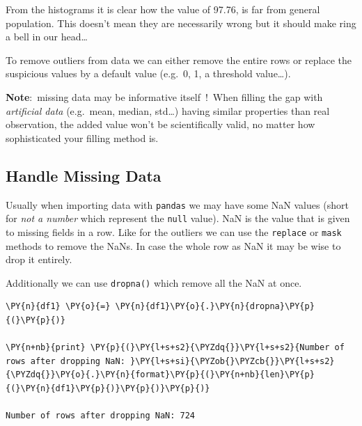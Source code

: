 From the histograms it is clear how the value of 97.76, is far from general population. This doesn't mean they are necessarily wrong but it should make ring a bell in our head\ldots{}

To remove outliers from data we can either remove the entire rows or replace the suspicious values by a default value (e.g.~0, 1, a threshold value\ldots{}).

\textbf{Note}:~missing data may be informative itself~!~When filling the gap with \emph{artificial data} (e.g.~mean, median, std\ldots{}) having similar properties than real observation, the added value won't be scientifically valid, no matter how sophisticated your filling method is.

\begin{Shaded}
\begin{Highlighting}[]

\NormalTok{, }\NormalTok{)      }
\OperatorTok{=}

\OperatorTok{=}\OperatorTok{>=} \NormalTok{, }\NormalTok{)   }
\end{Highlighting}
\end{Shaded}

\subsection{Handle Missing Data}\label{handle-missing-data}

Usually when importing data with \texttt{pandas} we may have some NaN values (short for \emph{not a number} which represent the \texttt{null} value). NaN is the value that is given to missing fields in a row. Like for the outliers we can use the \texttt{replace} or \texttt{mask} methods to remove the NaNs. In case the whole row as NaN it may be wise to drop it entirely.

Additionally we can use \texttt{dropna()} which remove all the NaN at once.

\begin{tcolorbox}[breakable, size=fbox, boxrule=1pt, pad at break*=1mm,colback=cellbackground, colframe=cellborder]
\begin{Verbatim}[commandchars=\\\{\}]
\PY{n}{df1} \PY{o}{=} \PY{n}{df1}\PY{o}{.}\PY{n}{dropna}\PY{p}{(}\PY{p}{)}

\PY{n+nb}{print} \PY{p}{(}\PY{l+s+s2}{\PYZdq{}}\PY{l+s+s2}{Number of rows after dropping NaN: }\PY{l+s+si}{\PYZob{}\PYZcb{}}\PY{l+s+s2}{\PYZdq{}}\PY{o}{.}\PY{n}{format}\PY{p}{(}\PY{n+nb}{len}\PY{p}{(}\PY{n}{df1}\PY{p}{)}\PY{p}{)}\PY{p}{)}

Number of rows after dropping NaN: 724
\end{Verbatim}
\end{tcolorbox}

